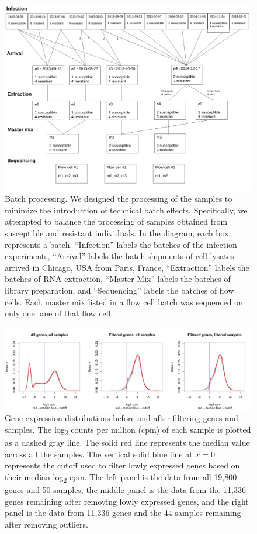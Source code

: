 \documentclass[fleqn,10pt]{wlscirep}
\begin{document}
\begin{figure}[ht]
\centering
\includegraphics[width=\linewidth]{../figure/processing.pdf}
\caption{
Batch processing. We designed the processing of the samples to
minimize the introduction of technical batch effects. Specifically, we
attempted to balance the processing of samples obtained from
susceptible and resistant individuals. In the diagram, each box
represents a batch. “Infection” labels the batches of the infection
experiments, “Arrival” labels the batch shipments of cell lysates
arrived in Chicago, USA from Paris, France, “Extraction” labels the
batches of RNA extraction, “Master Mix” labels the batches of library
preparation, and “Sequencing” labels the batches of flow cells. Each
master mix listed in a flow cell batch was sequenced on only one lane
of that flow cell.
}
\label{fig:process}
\end{figure}


\begin{figure}[ht]
\centering
\includegraphics[width=\linewidth]{../figure/gene-exp-distribution.pdf}
\caption{
Gene expression distributions before and after filtering genes and
samples. The log\textsubscript{2} counts per million (cpm) of each
sample is plotted as a dashed gray line. The solid red line represents
the median value across all the samples. The vertical solid blue line
at $x = 0$ represents the cutoff used to filter lowly expressed genes
based on their median log\textsubscript{2} cpm. The left panel is the
data from all 19,800 genes and 50 samples, the middle panel is the
data from the 11,336 genes remaining after removing lowly expressed
genes, and the right panel is the data from 11,336 genes and the 44
samples remaining after removing outliers.
}
\label{fig:gene}
\end{figure}
\end{document}
